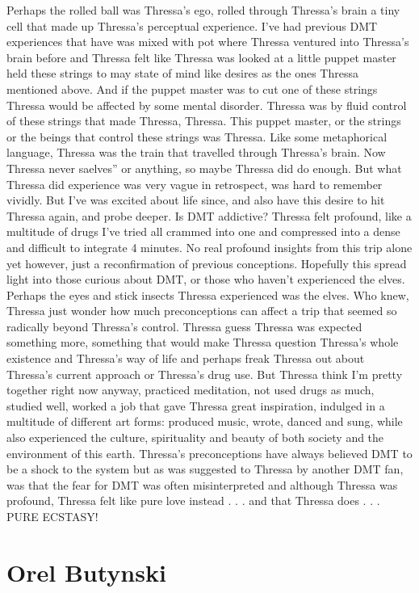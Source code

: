 \documentclass[12pt]{book}
\begin{document}
Perhaps the rolled ball was Thressa's ego, rolled through Thressa's brain a tiny cell that made up Thressa's perceptual experience. I've had previous DMT experiences that have was mixed with pot where Thressa ventured into Thressa's brain before and Thressa felt like Thressa was looked at a little puppet master held these strings to may state of mind like desires as the ones Thressa mentioned above. And if the puppet master was to cut one of these strings Thressa would be affected by some mental disorder. Thressa was by fluid control of these strings that made Thressa, Thressa. This puppet master, or the strings or the beings that control these strings was Thressa. Like some metaphorical language, Thressa was the train that travelled through Thressa's brain. Now Thressa never saelves'' or anything, so maybe Thressa did do enough. But what Thressa did experience was very vague in retrospect, was hard to remember vividly. But I've was excited about life since, and also have this desire to hit Thressa again, and probe deeper. Is DMT addictive? Thressa felt profound, like a multitude of drugs I've tried all crammed into one and compressed into a dense and difficult to integrate 4 minutes. No real profound insights from this trip alone yet however, just a reconfirmation of previous conceptions. Hopefully this spread light into those curious about DMT, or those who haven't experienced the elves. Perhaps the eyes and stick insects Thressa experienced was the elves. Who knew, Thressa just wonder how much preconceptions can affect a trip that seemed so radically beyond Thressa's control. Thressa guess Thressa was expected something more, something that would make Thressa question Thressa's whole existence and Thressa's way of life and perhaps freak Thressa out about Thressa's current approach or Thressa's drug use. But Thressa think I'm pretty together right now anyway, practiced meditation, not used drugs as much, studied well, worked a job that gave Thressa great inspiration, indulged in a multitude of different art forms: produced music, wrote, danced and sung, while also experienced the culture, spirituality and beauty of both society and the environment of this earth. Thressa's preconceptions have always believed DMT to be a shock to the system but as was suggested to Thressa by another DMT fan, was that the fear for DMT was often misinterpreted and although Thressa was profound, Thressa felt like pure love instead . . .  and that Thressa does . . .  PURE ECSTASY!



\chapter{Orel Butynski}
\end{document}
